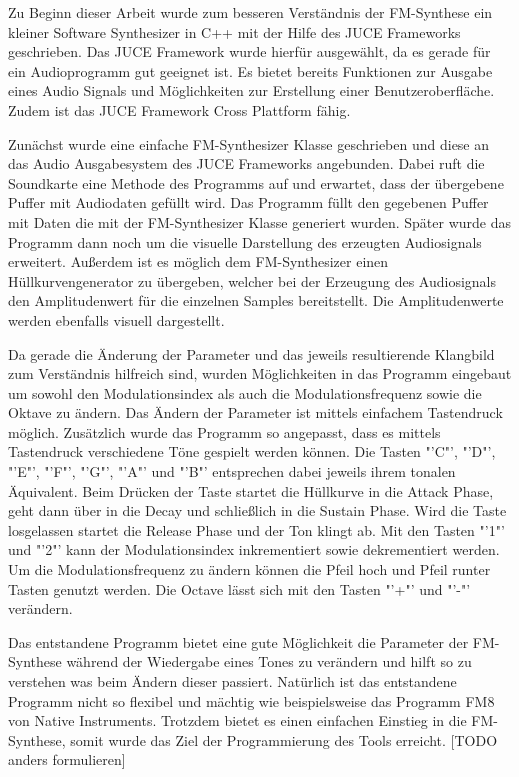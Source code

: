 Zu Beginn dieser Arbeit wurde zum besseren Verständnis der FM-Synthese ein kleiner Software Synthesizer in C++ mit der Hilfe des JUCE Frameworks geschrieben. Das JUCE Framework wurde hierfür ausgewählt, da es gerade für ein Audioprogramm gut geeignet ist. Es bietet bereits Funktionen zur Ausgabe eines Audio Signals und Möglichkeiten zur Erstellung einer Benutzeroberfläche. Zudem ist das JUCE Framework Cross Plattform fähig.

Zunächst wurde eine einfache FM-Synthesizer Klasse geschrieben und diese an das Audio Ausgabesystem des JUCE Frameworks angebunden. Dabei ruft die Soundkarte eine Methode des Programms auf und erwartet, dass der übergebene Puffer mit Audiodaten gefüllt wird. Das Programm füllt den gegebenen Puffer mit Daten die mit der FM-Synthesizer Klasse generiert wurden. Später wurde das Programm dann noch um die visuelle Darstellung des erzeugten Audiosignals erweitert. Außerdem ist es möglich dem FM-Synthesizer einen Hüllkurvengenerator zu übergeben, welcher bei der Erzeugung des Audiosignals den Amplitudenwert für die einzelnen Samples bereitstellt. Die Amplitudenwerte werden ebenfalls visuell dargestellt.

Da gerade die Änderung der Parameter und das jeweils resultierende Klangbild zum Verständnis hilfreich sind, wurden Möglichkeiten in das Programm eingebaut um sowohl den Modulationsindex als auch die Modulationsfrequenz sowie die Oktave zu ändern. Das Ändern der Parameter ist mittels einfachem Tastendruck möglich. Zusätzlich wurde das Programm so angepasst, dass es mittels Tastendruck verschiedene Töne gespielt werden können. Die Tasten "'C"', "'D"', "'E"', "'F"', "'G"', "'A"' und "'B"' entsprechen dabei jeweils ihrem tonalen Äquivalent. Beim Drücken der Taste startet die Hüllkurve in die Attack Phase, geht dann über in die Decay und schließlich in die Sustain Phase. Wird die Taste losgelassen startet die Release Phase und der Ton klingt ab. Mit den Tasten "'1"' und "'2"' kann der Modulationsindex inkrementiert sowie dekrementiert werden. Um die Modulationsfrequenz zu ändern können die Pfeil hoch und Pfeil runter Tasten genutzt werden. Die Octave lässt sich mit den Tasten "'+"' und "'-"' verändern.

Das entstandene Programm bietet eine gute Möglichkeit die Parameter der FM-Synthese während der Wiedergabe eines Tones zu verändern und hilft so zu verstehen was beim Ändern dieser passiert. Natürlich ist das entstandene Programm nicht so flexibel und mächtig wie beispielsweise das Programm FM8 von Native Instruments. Trotzdem bietet es einen einfachen Einstieg in die FM-Synthese, somit wurde das Ziel der Programmierung des Tools erreicht. [TODO anders formulieren]
\FloatBarrier
